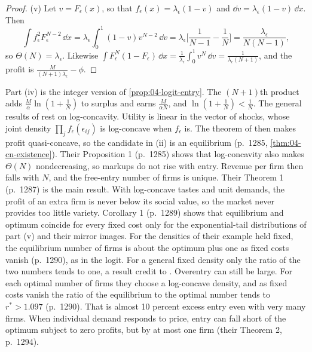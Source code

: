 \begin{proof}
(v) Let $v = F_\epsilon(x)$, so that $f_\epsilon(x) = \lambda_\epsilon(1 - v)$ and $\dd v = \lambda_\epsilon(1 - v)\,\dd x$. Then
\begin{equation*}
\int f_\epsilon^2F_\epsilon^{N-2}\,\dd x = \lambda_\epsilon\int_0^1(1 - v)v^{N-2}\,\dd v
= \lambda_\epsilon\Big[\frac{1}{N - 1} - \frac{1}{N}\Big] = \frac{\lambda_\epsilon}{N(N - 1)},
\end{equation*}
so $\Theta(N) = \lambda_\epsilon$. Likewise $\int F_\epsilon^N(1 - F_\epsilon)\,\dd x = \frac{1}{\lambda_\epsilon}\int_0^1v^N\,\dd v =
\frac{1}{\lambda_\epsilon(N + 1)}$, and the profit is $\frac{M}{(N + 1)\lambda_\epsilon} - \phi$.
\end{proof}

Part (iv) is the integer version of \cref{prop:04-logit-entry}. The $(N+1)$th product adds
$\frac{M}{\alpha}\ln(1 + \frac{1}{N})$ to surplus and earns $\frac{M}{\alpha N}$, and $\ln(1 + \frac{1}{N}) < \frac{1}{N}$.
The general results of \citet{AndersonDePalmaNesterov1995} rest on log-concavity. Utility is linear in the vector of
shocks, whose joint density $\prod_jf_\epsilon(\epsilon_{ij})$ is log-concave when $f_\epsilon$ is. The theorem of
\citet{CaplinNalebuff1991} then makes profit quasi-concave, so the candidate in (ii) is an equilibrium (p.~1285,
\cref{thm:04-cn-existence}). Their Proposition 1 (p.~1285) shows that log-concavity also makes $\Theta(N)$
nondecreasing, so markups do not rise with entry. Revenue per firm then falls with $N$, and the free-entry number of
firms is unique. Their Theorem 1 (p.~1287) is the main result. With log-concave tastes and unit demands, the profit of
an extra firm is never below its social value, so the market never provides too little variety. Corollary 1
(p.~1289) shows that equilibrium and optimum coincide for every fixed cost only for the exponential-tail
distributions of part (v) and their mirror images. For the densities of their example held fixed, the equilibrium
number of firms is about the optimum plus one as fixed costs vanish (p.~1290), as in the logit. For a general fixed
density only the ratio of the two numbers tends to one, a result \citet[p.~1283]{AndersonDePalmaNesterov1995}
credit to \citet{DeneckereRothschild1992}. Overentry can still be large. For
each optimal number of firms they choose a log-concave density, and as fixed costs vanish the ratio of the
equilibrium to the optimal number tends to $r^* > 1.097$ (p.~1290). That is almost 10 percent excess entry even with
very many firms. When individual demand responds to price, entry can fall short of the optimum subject to zero
profits, but by at most one firm (their Theorem 2, p.~1294).

